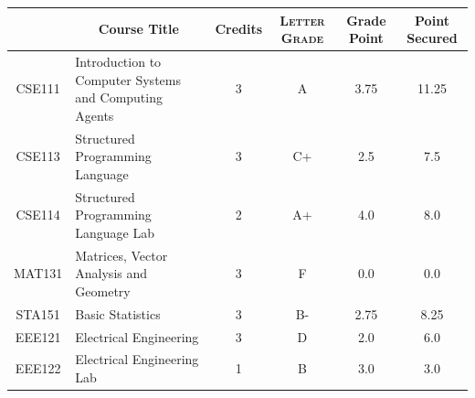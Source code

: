 \documentclass[11pt]{article}
\newcommand*{\numtwo}[1]{\pgfmathprintnumber[
                    fixed, precision=2, fixed zerofill=true]{#1}}
\begin{document}
                \begin{center}
                    \renewcommand{\arraystretch}{1.08}
                    
                \begin{tabular}{|c|l|c|>{\scshape}c|c|c|}
                \hline  \rule[-1ex]{0pt}{3.5ex} {\centering{\bf Course Code}} &  \multicolumn{1}{c|}{\textbf{Course Title}}  & {\bf Credits} & {\bf Letter Grade} & {\bf Grade Point} & {\bf Point Secured}  \\ 
                \hline   CSE111 &  Introduction to Computer Systems and Computing Agents		 & 3 & A & 3.75 & 11.25 \\ %
                \hline   CSE113 &  Structured Programming Language		 & 3 & C+ & 2.5 & 7.5 \\ %
                \hline   CSE114 &  Structured Programming Language Lab		 & 2 & A+ & 4.0 & 8.0 \\ %
                \hline   MAT131 &  Matrices, Vector Analysis and Geometry		 & 3 & F & 0.0 & 0.0 \\ %
                \hline   STA151 &  Basic Statistics		 & 3 & B- & 2.75 & 8.25 \\ %
                \hline   EEE121 &  Electrical Engineering		 & 3 & D & 2.0 & 6.0 \\ %
                \hline   EEE122 &  Electrical Engineering Lab		 & 1 & B & 3.0 & 3.0 \\ %

\hline                %
                \end{tabular}
                \end{center}
                \renewcommand{\arraystretch}{1.03}
\end{document}
